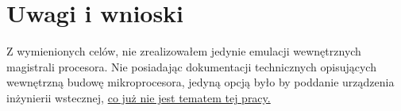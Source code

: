 \chapter{Uwagi i wnioski}
	
	Z  wymienionych celów, nie zrealizowałem jedynie emulacji wewnętrznych magistrali procesora. Nie posiadając dokumentacji technicznych opisujących wewnętrzną budowę mikroprocesora, jedyną opcją było by poddanie urządzenia inżynierii wstecznej, \underline{co już nie jest tematem tej pracy.}